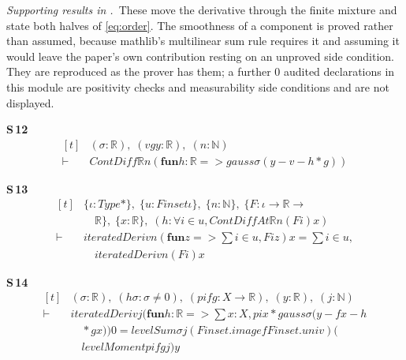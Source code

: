 \noindent\emph{Supporting results in .}~These move the derivative through the finite mixture and state both halves of \eqref{eq:order}. The smoothness of a component is proved rather than assumed, because mathlib's multilinear sum rule requires it and assuming it would leave the paper's own contribution resting on an unproved side condition. They are reproduced as the prover has them; a further $0$ audited declarations in this module are positivity checks and measurability side conditions and are not displayed.

\noindent\textbf{S\,12}\quad{}
{\footnotesize\[ \begin{aligned}[t]
&(\sigma : \mathbb{R} ),\; (\mathit{v} \mathit{g} \mathit{y} : \mathbb{R} ),\; (\mathit{n} : \mathbb{N} )\\
\vdash\;&\mathit{ContDiff} \mathbb{R} \mathit{n} (\mathbf{fun} \mathit{h} : \mathbb{R} => \mathit{gauss} \sigma (\mathit{y} - \mathit{v} - \mathit{h} * \mathit{g}))
\end{aligned} \]}

\noindent\textbf{S\,13}\quad{}
{\footnotesize\[ \begin{aligned}[t]
&\{ \iota : \mathit{Type}*\},\; \{ \mathit{u} : \mathit{Finset} \iota \},\; \{ \mathit{n} : \mathbb{N} \},\; \{ \mathit{F} : \iota \to \mathbb{R} \to\\
&\quad \mathbb{R} \},\; \{ \mathit{x} : \mathbb{R} \},\; (\mathit{h} : \forall \mathit{i} \in \mathit{u}, \mathit{ContDiffAt} \mathbb{R} \mathit{n} (\mathit{F} \mathit{i}) \mathit{x})\\
\vdash\;&\mathit{iteratedDeriv} \mathit{n} (\mathbf{fun} \mathit{z} => \textstyle\sum \mathit{i} \in \mathit{u}, \mathit{F} \mathit{i} \mathit{z}) \mathit{x} = \textstyle\sum \mathit{i} \in \mathit{u},\\
&\quad \mathit{iteratedDeriv} \mathit{n} (\mathit{F} \mathit{i}) \mathit{x}
\end{aligned} \]}

\noindent\textbf{S\,14}\quad{}
{\footnotesize\[ \begin{aligned}[t]
&(\sigma : \mathbb{R} ),\; (\mathit{hσ} : \sigma \neq 0),\; (\mathit{pi} \mathit{f} \mathit{g} : \mathit{X} \to \mathbb{R} ),\; (\mathit{y} : \mathbb{R} ),\; (\mathit{j} : \mathbb{N} )\\
\vdash\;&\mathit{iteratedDeriv} \mathit{j} (\mathbf{fun} \mathit{h} : \mathbb{R} => \textstyle\sum \mathit{x} : \mathit{X}, \mathit{pi} \mathit{x} * \mathit{gauss} \sigma (\mathit{y} - \mathit{f} \mathit{x} - \mathit{h}\\
&\quad * \mathit{g} \mathit{x})) 0 = \mathit{levelSum} \sigma \mathit{j} (\mathit{Finset}.\mathit{image} \mathit{f} \mathit{Finset}.\mathit{univ}) (\\
&\quad \mathit{levelMoment} \mathit{pi} \mathit{f} \mathit{g} \mathit{j}) \mathit{y}
\end{aligned} \]}

